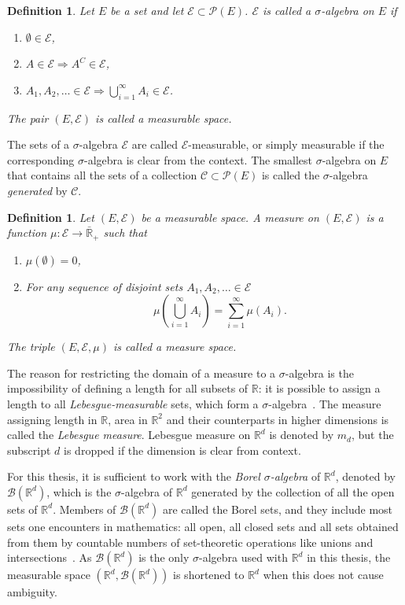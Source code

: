\documentclass[english,twoside,openright]{HYgraduMLDS}
\newtheorem{definition}[lemma]{Definition}
\newcommand{\R}{\mathbb{R}}
\begin{document}
\begin{definition}
  Let \(E\) be a set and let \(\mathcal{E}\subset \mathcal{P}(E)\).
  \(\mathcal{E}\) is called a \(\sigma\)-algebra on \(E\) if
  \begin{enumerate}
    \item \(\emptyset \in \mathcal{E}\),
    \item \(A\in \mathcal{E}\Rightarrow A^{C}\in \mathcal{E}\),
    \item \(A_{1},A_{2},\dotsc \in \mathcal{E}
          \Rightarrow \bigcup_{i=1}^{\infty} A_{i}\in \mathcal{E}\).
  \end{enumerate}
  The pair \((E, \mathcal{E})\) is called a measurable space.
\end{definition}
The sets of a \(\sigma\)-algebra \(\mathcal{E}\) are called
\(\mathcal{E}\)-measurable, or simply measurable if the corresponding
\(\sigma\)-algebra is clear from the context. The smallest \(\sigma\)-algebra
on \(E\) that contains all the sets of a collection
\(\mathcal{C}\subset \mathcal{P}(E)\) is called the \(\sigma\)-algebra
\emph{generated} by \(\mathcal{C}\).

\begin{definition}
	Let \((E, \mathcal{E})\) be a measurable space. A measure on \((E, \mathcal{E})\)
  is a function \(\mu\colon \mathcal{E}\to \bar{\R}_{+}\) such that
  \begin{enumerate}
    \item
    \(\mu(\emptyset) = 0\),
    \item
    For any sequence of disjoint sets \(A_{1}, A_{2},\dotsc \in \mathcal{E}\)
    \[
    \quad \mu\left(\bigcup_{i=1}^{\infty} A_{i}\right)
    = \sum_{i=1}^\infty\mu(A_{i}).
    \]
  \end{enumerate}
  The triple \((E, \mathcal{E}, \mu)\) is called a measure space.
\end{definition}

The reason for restricting the domain of a measure to a \(\sigma\)-algebra
is the impossibility of defining a length for all subsets of \(\R\): it is
possible to assign a length to all \emph{Lebesgue-measurable} sets, which form
a \(\sigma\)-algebra~\cite{Cin11}. The measure assigning length in \(\R\),
area in \(\R^{2}\) and their counterparts in higher dimensions is called the
\emph{Lebesgue measure}. Lebesgue measure on \(\R^{d}\) is denoted by
\(m_{d}\), but the subscript \(d\) is dropped if the dimension is clear
from context.

For this thesis, it is sufficient to
work with the \emph{Borel \(\sigma\)-algebra} of \(\R^{d}\), denoted by
\(\mathcal{B}(\R^{d})\), which is
the \(\sigma\)-algebra of \(\R^{d}\) generated by the collection of all the open sets
of \(\R^{d}\). Members of \(\mathcal{B}(\R^{d})\) are called the Borel sets,
and they include most sets one encounters in mathematics: all open, all closed
sets and all sets obtained from them by countable numbers of set-theoretic
operations like unions and intersections~\cite{Cin11}. As \(\mathcal{B}(\R^{d})\) is the
only \(\sigma\)-algebra used with \(\R^{d}\) in this thesis, the measurable space
\((\R^{d}, \mathcal{B}(\R^{d}))\) is shortened to \(\R^{d}\) when this does not
cause ambiguity.
\end{document}
